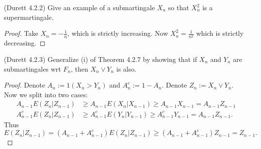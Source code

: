 \begin{problem}(Durett 4.2.2)
	Give an example of a submartingale $X_n$ so that $X_n^2$ is a supermartingale.
\end{problem}
\begin{proof}
	Take $X_n = - \frac{1}{n}$, which is strictly increasing. Now $X_n^2  = \frac{1}{n^2}$ which is strictly decreasing.
\end{proof}

\begin{problem}(Durett 4.2.3)
	Generalize (i) of Theorem 4.2.7 by showing that if $X_n$ and $Y_n$ are submartingales wrt $F_n$, then $X_n \vee Y_n$ is also.
\end{problem}
\begin{proof}
	Denote $A_n := 1(X_n > Y_n) $ and $A_{n}^c := 1 - A_{n}$. Denote $Z_n := X_n \vee Y_n$. Now we split into two cases:
	\begin{align*}
		A_{n-1} E(Z_n | Z_{n-1})
		&\ge  A_{n-1} E(X_n | X_{n-1}) 
		\ge A_{n-1} X_{n-1} 
		= A_{n-1} Z_{n-1}\\
		A_{n-1}^c E(Z_n | Z_{n-1})
		&\ge  A_{n-1}^c E(Y_n | Y_{n-1}) 
		\ge A_{n-1}^c Y_{n-1} 
		= A_{n-1} Z_{n-1}
	.\end{align*}
	Thus 
	\[
		E(Z_n | Z_{n-1}) = (A_{n-1} + A_{n-1}^c) E(Z_n | Z_{n-1}) \ge (A_{n-1} + A_{n-1}^c) Z_{n-1} = Z_{n-1}
	.\] 
\end{proof}







